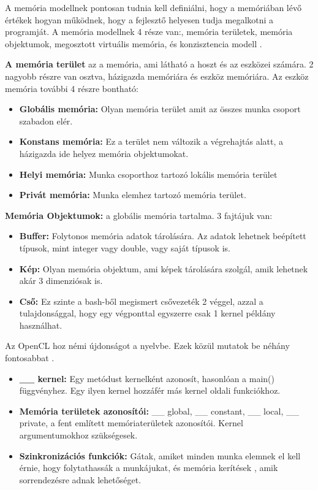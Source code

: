 A memória modellnek pontosan tudnia kell definiálni, hogy a memóriában lévő értékek hogyan működnek, hogy a fejlesztő helyesen tudja megalkotni a programját. A memória modellnek 4 része van:, memória területek, memória objektumok, megosztott virtuális memória, és konzisztencia modell \cite{spec_mem}.

\textbf{A memória terület} az a memória, ami látható a hoszt és az eszközei számára. 2 nagyobb részre van osztva, házigazda memóriára és eszköz memóriára. Az eszköz memória további 4 részre bontható:
\begin{itemize}
\item\textbf{Globális memória:} Olyan memória terület amit az összes munka csoport szabadon elér.
\item\textbf{Konstans memória:} Ez a terület nem változik a végrehajtás alatt, a házigazda ide helyez memória objektumokat.
\item\textbf{Helyi memória:} Munka csoporthoz tartozó lokális memória terület
\item\textbf{Privát memória:} Munka elemhez tartozó memória terület.
\end{itemize}
\textbf{Memória Objektumok:} a globális memória tartalma. 3 fajtájuk van:
\begin{itemize}
\item\textbf{Buffer:} Folytonos memória adatok tárolására. Az adatok lehetnek beépített típusok, mint integer vagy double, vagy saját típusok is.
\item\textbf{Kép:} Olyan memória objektum, ami képek tárolására szolgál, amik lehetnek akár 3 dimenziósak is.
\item\textbf{Cső:} Ez szinte a bash-ből megismert csővezeték 2 véggel, azzal a tulajdonsággal, hogy egy végponttal egyszerre csak 1 kernel példány használhat.
\end{itemize}

Az OpenCL hoz némi újdonságot a nyelvbe. Ezek közül mutatok be néhány fontosabbat \cite{opencl_c}.
\begin{itemize}
\item\textbf{\_\_ kernel:} Egy metódust kernelként azonosít, hasonlóan a main() függvényhez. Egy ilyen kernel hozzáfér más kernel oldali funkciókhoz.
\item\textbf{Memória területek azonosítói:} \_\_ global, \_\_ constant, \_\_ local, \_\_ private, a fent említett memóriaterületek azonosítói. Kernel argumentumokhoz szükségesek.
\item\textbf{Szinkronizációs funkciók:} Gátak, amiket minden munka elemnek el kell érnie, hogy folytathassák a munkájukat, és memória kerítések \cite{fence}, amik sorrendezésre adnak lehetőséget.
\end{itemize}

